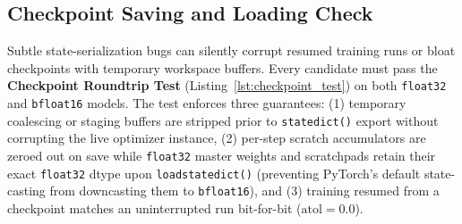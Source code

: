 \documentclass[11pt,a4paper]{article}
\renewcommand{\_}{\origunderscore\allowbreak}
\begin{document}
\subsection{Checkpoint Saving and Loading Check}
\noindent
Subtle state-serialization bugs can silently corrupt resumed training runs or bloat checkpoints with temporary workspace buffers. Every candidate must pass the \textbf{Checkpoint Roundtrip Test} (Listing~\ref{lst:checkpoint_test}) on both \texttt{float32} and \texttt{bfloat16} models. The test enforces three guarantees: (1) temporary coalescing or staging buffers are stripped prior to \texttt{state\_dict()} export without corrupting the live optimizer instance, (2) per-step scratch accumulators are zeroed out on save while \texttt{float32} master weights and scratchpads retain their exact \texttt{float32} dtype upon \texttt{load\_state\_dict()} (preventing PyTorch's default state-casting from downcasting them to \texttt{bfloat16}), and (3) training resumed from a checkpoint matches an uninterrupted run bit-for-bit ($\text{atol} = 0.0$).
\end{document}
